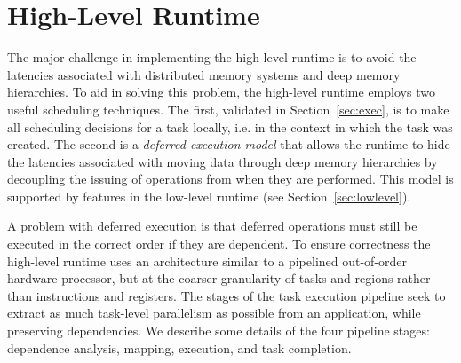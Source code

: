 
\section{High-Level Runtime} 
\label{sec:highlevel}

The major challenge in implementing the high-level
runtime is to avoid the latencies associated with distributed
memory systems and deep memory hierarchies.  To aid
in solving this problem, the high-level runtime employs two useful 
scheduling techniques.  The first, validated in 
Section~\ref{sec:exec}, is to make all scheduling decisions for a
task locally, i.e. in the context in which the
task was created.  The second is a {\em deferred execution model} 
that allows the runtime to hide the latencies associated
with moving data through deep memory hierarchies by decoupling the issuing
of operations
from when they are performed.  This model is supported
by features in the low-level runtime (see Section~\ref{sec:lowlevel}).


A problem with deferred execution is that deferred operations must
still be executed in the correct order if they are dependent.
To ensure correctness the high-level runtime uses an architecture
similar to a pipelined out-of-order hardware processor, but at
the coarser granularity of tasks and regions rather than instructions and registers.
The stages of the task execution pipeline seek to extract
as much task-level parallelism as possible from an application, while
preserving dependencies.  We describe some
details of the four pipeline stages: dependence analysis, mapping, execution, and
task completion.

